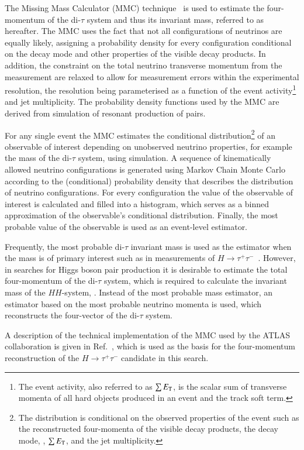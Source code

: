 The Missing Mass Calculator (MMC) technique~\cite{Elagin:2010aw} is
used to estimate the four-momentum of the di-$\tau$ system and thus
its invariant mass, referred to as \mMMC hereafter. The MMC uses the
fact that not all configurations of neutrinos are equally likely,
assigning a probability density for every configuration conditional on
the \taulepton decay mode and other properties of the visible decay
products. In addition, the constraint on the total neutrino transverse
momentum from the \pTmiss measurement are relaxed to allow for
measurement errors within the experimental resolution, the resolution
being parameterised as a function of the event activity\footnote{The
  event activity, also referred to as $\sum E_{\text{T}}$, is the scalar sum
  of transverse momenta of all hard objects produced in an event and
  the track soft term.} and jet multiplicity. The probability density
functions used by the MMC are derived from simulation of resonant
production of \taulepton pairs.

For any single event the MMC estimates the conditional
distribution\footnote{The distribution is conditional on the observed
  properties of the event such as the reconstructed four-momenta of
  the visible \taulepton decay products, the \taulepton decay mode,
  \pTmiss, $\sum E_{\text{T}}$, and the jet multiplicity.} of an observable of
interest depending on unobserved neutrino properties, for example the
mass of the di-$\tau$ system, using simulation. %
A sequence of kinematically allowed neutrino configurations is
generated using Markov Chain Monte Carlo according to the
(conditional) probability density that describes the distribution of
neutrino configurations. For every configuration the value of the
observable of interest is calculated and filled into a histogram,
which serves as a binned approximation of the observable's conditional
distribution. Finally, the most probable value of the observable is
used as an event-level estimator.

Frequently, the most probable di-$\tau$ invariant mass is used as the estimator
when the mass is of primary interest such as in measurements of
$H \to \tau^{+}\tau^{-}$~\cite{HIGG-2019-09}. However, in searches for Higgs
boson pair production it is desirable to estimate the total four-momentum of the
di-$\tau$ system, which is required to calculate the invariant mass of the
$HH$-system, \mHH.
Instead of the most probable mass estimator, an estimator based on the most
probable neutrino momenta is used, which reconstructs the four-vector of the
di-$\tau$ system.

A description of the technical implementation of the MMC used by the ATLAS
collaboration is given in Ref.~\cite{huebner}, which is used as the basis for
the four-momentum reconstruction of the $H \to \tau^{+}\tau^{-}$ candidate in
this search.

